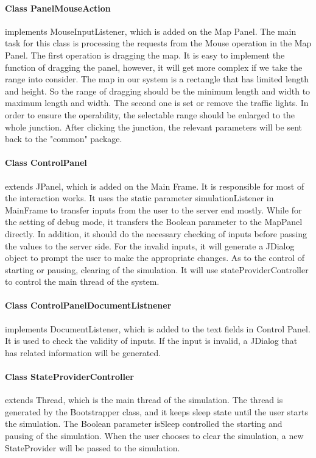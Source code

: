 \documentclass[a4paper,12pt]{article}
\begin{document}
\paragraph{Class PanelMouseAction} implements MouseInputListener, which is added on the Map Panel. The main task for this class is processing the requests from the Mouse operation in the Map Panel. The first operation is dragging the map. It is easy to implement the function of dragging the panel, however, it will get more complex if we take the range into consider. The map in our system is a rectangle that has limited length and height. So the range of dragging should be the minimum length and width to maximum length and width. The second one is set or remove the traffic lights. In order to ensure the operability, the selectable range should be enlarged to the whole junction. After clicking the junction, the relevant parameters will be sent back to the "common" package.
\paragraph{Class ControlPanel} extends JPanel, which is added on the Main Frame. It is responsible for most of the interaction works. It uses the static parameter simulationListener in MainFrame to transfer inputs from the user to the server end mostly. While for the setting of debug mode, it transfers the Boolean parameter to the MapPanel directly. In addition, it should do the necessary checking of inputs before passing the values to the server side. For the invalid inputs, it will generate a JDialog object to prompt the user to make the appropriate changes. As to the control of starting or pausing, clearing of the simulation. It will use stateProviderController to control the main thread of the system.
\paragraph{Class ControlPanelDocumentListnener} implements DocumentListener, which is added to the text fields in Control Panel. It is used to check the validity of inputs. If the input is invalid, a JDialog that has related information will be generated.
\paragraph{Class StateProviderController} extends Thread, which is the main thread of the simulation. The thread is generated by the Bootstrapper class, and it keeps sleep state until the user starts the simulation. The Boolean parameter isSleep controlled the starting and pausing of the simulation. When the user chooses to clear the simulation, a new StateProvider will be passed to the simulation.
\end{document}
